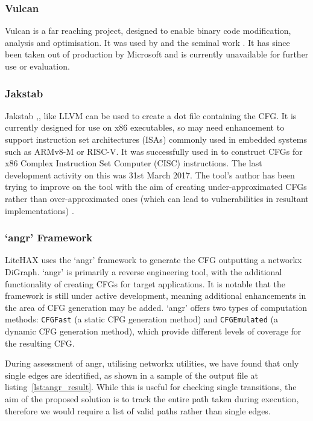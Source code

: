\subsubsection*{Vulcan}

Vulcan \cite{Edwards2001} is a far reaching project, designed to enable binary code modification, analysis and optimisation. It was used by \cite{Davi2012} and the seminal work \cite{Abadi2005}. It has since been taken out of production by Microsoft and is currently unavailable for further use or evaluation.

\subsubsection*{Jakstab}

Jakstab \cite{Kinder2008},\cite{Kinder2010}, like LLVM can be used to create a dot file containing the CFG. It is currently designed for use on x86 executables, so may need enhancement to support instruction set architectures (ISAs) commonly used in embedded systems such as ARMv8-M or RISC-V. It was successfully used in \cite{Nguyen2013} to construct CFGs for x86 Complex Instruction Set Computer (CISC) instructions. The last development activity on this was 31st March 2017. The tool's author has been trying to improve on the tool with the aim of creating under-approximated CFGs rather than over-approximated ones (which can lead to vulnerabilities in resultant implementations) \cite{Kinder2012}.

\subsubsection*{`angr' Framework}

LiteHAX \cite{Dessouky2018} uses the `angr' \cite{Shoshitaishvili2016} framework to generate the CFG outputting a networkx \cite{Hagberg2008} DiGraph. `angr' is primarily a reverse engineering tool, with the additional functionality of creating CFGs for target applications. It is notable that the framework is still under active development, meaning additional enhancements in the area of CFG generation may be added. `angr' offers two types of computation methods: \verb|CFGFast| (a static CFG generation method) and \verb|CFGEmulated| (a dynamic CFG generation method), which provide different levels of coverage for the resulting CFG.  

During assessment of angr, utilising networkx utilities, we have found that only single edges are identified, as shown in a sample of the output file at listing~\ref{lst:angr_result}. While this is useful for checking single transitions, the aim of the proposed solution is to track the entire path taken during execution, therefore we would require a list of valid paths rather than single edges.

